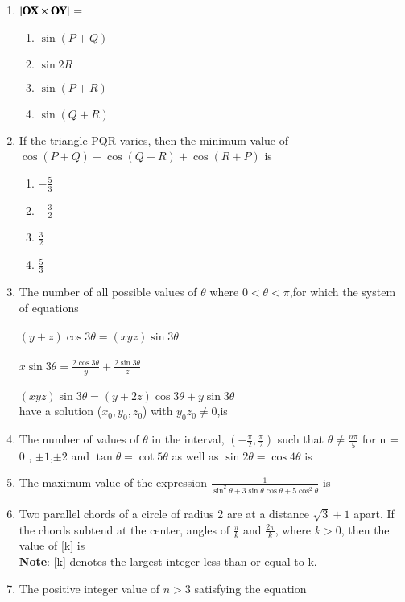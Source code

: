 \begin{enumerate}[label=\arabic*.,ref=\thesubsection.\theenumi]
    \item $\left\vert \mathbf {OX} \times \mathbf {OY}\right\vert$ =
    \begin{enumerate}
        \item $\sin{(P+Q)}$
        \item $\sin{2R}$
        \item $\sin{(P+R)}$
        \item $\sin{(Q+R)}$
    \end{enumerate}
    \item If the triangle PQR varies, then the minimum value of $\cos{(P+Q)}+\cos{(Q+R)}+\cos{(R+P)}$ is \begin{enumerate}
        \item $-\frac{5}{3}$
        \item $-\frac{3}{2}$
        \item $ \frac{3}{2}$
        \item $ \frac{5}{3}$
    \end{enumerate}
    \item The number of all possible values of $\theta$ where $0<\theta<\pi$,for which the system of equations\\\\
    $(y+z) \cos 3\theta = (xyz)\sin 3 \theta$\\\\
    $x \sin 3\theta =  {\frac{2\cos 3 \theta}{y}}+{\frac{2 \sin 3\theta}{z}}$\\\\
    $(xyz)\sin 3\theta = (y+2z)\cos 3\theta + y\sin 3\theta$\\
    have a solution ($x_0 , y_0 , z_0$) with $y_0 z_0 \neq 0$,is
    \item The number of values of $\theta$ in the interval, $({-\frac{\pi}{2}},{\frac{\pi}{2}})$ such that $\theta \neq {\frac{n \pi}{5}}$ for n = 0 , $\pm1$,$\pm2$ and $\tan\theta = \cot 5\theta$ as well as $\sin 2\theta = \cos 4\theta$ is 
    \item The maximum value of the expression ${\frac{1}{\sin^2\theta + 3 \sin\theta \cos\theta + 5\cos^2 \theta}}$ is 
    \item Two parallel chords of a circle of radius 2 are at a distance $\sqrt3 + 1$ apart. If the chords subtend at the center, angles of ${\frac{\pi}{k}}$ and ${\frac{2\pi}{k}}$, where $k > 0$, then the value of [k] is\\
    \textbf{Note}: [k] denotes the largest integer less than or equal to k.
    \item The positive integer value of $n>3$ satisfying the equation \\

\end{enumerate}
